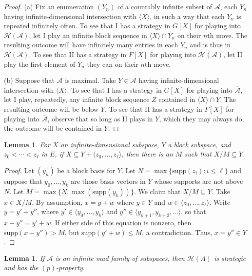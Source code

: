 \documentclass[11pt]{amsart}
\renewcommand{\bar}{\overline}
\newcommand{\LA}{\mathcal{A}}
\newtheorem{lemma}[thm]{Lemma}
\theoremstyle{definition}
\theoremstyle{remark}
\newcommand{\LH}{\mathcal{H}}
\newcommand{\supp}{\mathrm{supp}}
\renewcommand{\1}{\mathbf{1}}
\begin{document}
\begin{proof}
	(a) Fix an enumeration $(Y_n)$ of a countably infinite subset of $\LA$, each $Y_n$ having infinite-dimensional intersection with $\langle X\rangle$, in such a way that each $Y_n$ is repeated infinitely often. To see that I has a strategy in $G[X]$ for playing into $\LH(\LA)$, let I play an infinite block sequence in $\langle X\rangle\cap Y_n$ on their $n$th move. The resulting outcome will have infinitely many entries in each $Y_n$ and is thus in $\LH(\LA)$. To see that II has a strategy in $F[X]$ for playing into $\LH(\LA)$, let II play the first element of $Y_n$ they can on their $n$th move.%

	\noindent(b) Suppose that $\LA$ is maximal. Take $Y\in\LA$ having infinite-dimensional intersection with $\langle X\rangle$. To see that I has a strategy in $G[X]$ for playing into $\bar{\LA}$, let I play, repeatedly, any infinite block sequence $Z$ contained in $\langle X\rangle\cap Y$. The resulting outcome will be below $Y$. To see that II has a strategy in $F[X]$ for playing into $\bar{\LA}$, observe that so long as II plays in $Y$, which they may always do, the outcome will be contained in $Y$. 	
\end{proof}

\begin{lemma}\label{lem:cont_mod_finite}
	For $X$ an infinite-dimensional subspace, $Y$ a block subspace, and $z_0<\cdots<z_\ell$ in $E$, if $X\subseteq Y+\langle z_0,\ldots,z_\ell\rangle$, then there is an $M$ such that $X/M\subseteq Y$.	
\end{lemma}%

\begin{proof}
	Let $(y_n)$ be a block basis for $Y$. Let $N = \max\{\supp(z_i):i\leq\ell\}$ and suppose that $y_0,\ldots,y_k$ are those basis vectors in $Y$ whose supports are not above $N$. Let $M=\max\{N,\max(\supp(y_k))\}$. We claim that $X/M\subseteq Y$. Take $x\in X/M$. By assumption, $x=y+w$ where $y\in Y$ and $w\in\langle z_0,\ldots,z_\ell\rangle$. Write $y=y'+y''$, where $y'\in\langle y_0,\ldots,y_k\rangle$ and $y''\in\langle y_{k+1},y_{k+2},\ldots\rangle$, so that $x-y''=y'+w$. If either side of this equation is nonzero, then $\supp(x-y'')>M$, but $\supp(y'+w)\leq M$, a contradiction. Thus, $x=y''\in Y$.
\end{proof}

\begin{lemma}\label{lem:mad_strat_p}
	If $\LA$ is an infinite mad family of subspaces, then $\LH(A)$ is strategic and has the $(p)$-property.
\end{lemma}
\end{document}
